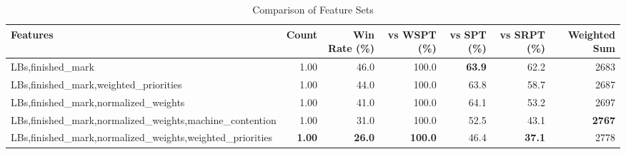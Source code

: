 \begin{table}[htbp]%
\centering%
\begin{tabular}{lrrrrrr}%
\toprule%
\textbf{Features}&\textbf{Count}&\textbf{Win Rate (\%)}&\textbf{vs WSPT (\%)}&\textbf{vs SPT (\%)}&\textbf{vs SRPT (\%)}&\textbf{Weighted Sum}\\%
\midrule%
LBs,finished_mark&1.00&46.0&100.0&\textbf{63.9}&62.2&2683\\%
LBs,finished_mark,weighted_priorities&1.00&44.0&100.0&63.8&58.7&2687\\%
LBs,finished_mark,normalized_weights&1.00&41.0&100.0&64.1&53.2&2697\\%
LBs,finished_mark,normalized_weights,machine_contention&1.00&31.0&100.0&52.5&43.1&\textbf{2767}\\%
LBs,finished_mark,normalized_weights,weighted_priorities&\textbf{1.00}&\textbf{26.0}&\textbf{100.0}&46.4&\textbf{37.1}&2778\\%
\bottomrule%
\end{tabular}%
\caption{Comparison of Feature Sets}%
\label{tab:features}%
\end{table}